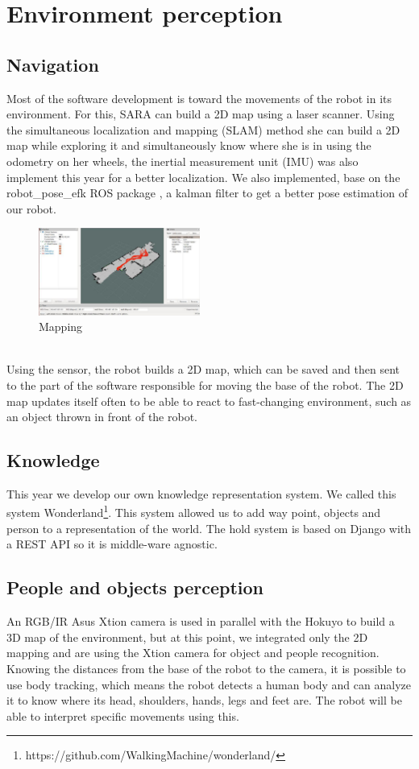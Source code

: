 \documentclass[runningheads,a4paper]{llncs}
\begin{document}
\section{Environment perception}

\subsection{Navigation}
\tab Most of the software development is toward the movements of the robot in its environment. For this, SARA can build a 2D map using a laser scanner. Using the simultaneous localization and mapping (SLAM) method she can build a 2D map while exploring it and simultaneously know where she is in using the odometry on her wheels, the inertial measurement unit (IMU) was also implement this year for a better localization. We also implemented, base on the robot\_pose\_efk ROS package \cite{poseefk}, a kalman filter to get a better pose estimation of our robot. \\
\begin{figure}
  \centering
  \includegraphics[width=150pt]{images/map.jpg}
  \caption{Mapping}
\end{figure}\\
Using the sensor, the robot builds a 2D map, which can be saved and then sent to the part of the software responsible for moving the base of the robot. The 2D map updates itself often to be able to react to fast-changing environment, such as an object thrown in front of the robot.


\subsection{Knowledge}
\tab This year we develop our own knowledge representation system. We called this system Wonderland\footnote{https://github.com/WalkingMachine/wonderland/}. This system allowed us to add way point, objects and person to a representation of the world. The hold system is based on Django with a REST API so it is middle-ware agnostic.


\subsection{People and objects perception}
\tab An RGB/IR Asus Xtion camera is used in parallel with the Hokuyo to build a 3D map of the environment, but at this point, we integrated only the 2D mapping and are using the Xtion camera for object and people recognition. Knowing the distances from the base of the robot to the camera, it is possible to use body tracking, which means the robot detects a human body and can analyze it to know where its head, shoulders, hands, legs and feet are. The robot will be able to interpret specific movements using this. \\
\end{document}
